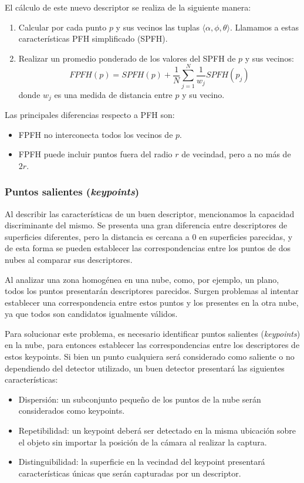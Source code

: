 El cálculo de este nuevo descriptor se realiza de la siguiente manera:
\begin{enumerate}
	\item Calcular por cada punto $p$ y sus vecinos las tuplas $\langle \alpha, \phi, \theta \rangle$.
		Llamamos a estas características PFH simplificado (SPFH).
	\item Realizar un promedio ponderado de los valores del SPFH de $p$ y sus vecinos:
		\[
			FPFH(p) = SPFH(p) + \frac{1}{N} \sum_{j=1}^{N} \frac{1}{w_j} SPFH(p_j)
		\]
		donde $w_j$ es una medida de distancia entre $p$ y su vecino.
\end{enumerate}
Las principales diferencias respecto a PFH son:
\begin{itemize}
	\item FPFH no interconecta todos los vecinos de $p$.
	\item FPFH puede incluir puntos fuera del radio $r$ de vecindad, pero a no más de $2r$.
\end{itemize}


\subsubsection{Puntos salientes (\emph{keypoints})}
Al describir las características de un buen descriptor, mencionamos la capacidad discriminante del mismo.
Se presenta una gran diferencia entre descriptores de superficies diferentes,
pero la distancia es cercana a $0$ en superficies parecidas,
y de esta forma se pueden establecer las correspondencias entre los puntos de dos nubes
al comparar sus descriptores.

Al analizar una zona homogénea en una nube, como, por ejemplo, un plano,
todos los puntos presentarán descriptores parecidos.
Surgen problemas al intentar establecer una correspondencia entre estos puntos
y los presentes en la otra nube, ya que todos son candidatos igualmente válidos.

Para solucionar este problema, es necesario identificar puntos salientes (\emph{keypoints}) 
en la nube, para entonces establecer las correspondencias entre los descriptores de estos keypoints.
Si bien un punto cualquiera será considerado como saliente o no dependiendo del detector utilizado,
un buen detector presentará las siguientes características:
\begin{itemize}
	\item Dispersión: un subconjunto pequeño de los puntos de la nube serán considerados como keypoints.
	\item Repetibilidad: un keypoint deberá ser detectado en la misma ubicación
		sobre el objeto sin importar la posición de la cámara al realizar la captura.
	\item Distinguibilidad: la superficie en la vecindad del keypoint
		presentará características únicas que serán capturadas por un descriptor.
\end{itemize}

